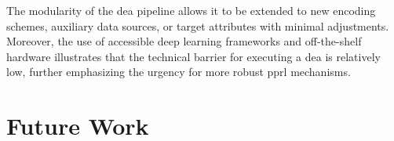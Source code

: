 The modularity of the \ac{dea} pipeline allows it to be extended to new encoding schemes, auxiliary data sources, or target attributes with minimal adjustments.
Moreover, the use of accessible deep learning frameworks and off-the-shelf hardware illustrates that the technical barrier for executing a \ac{dea} is relatively low, further emphasizing the urgency for more robust \ac{pprl} mechanisms.








\section{Future Work}  \label{sec:future-work}

